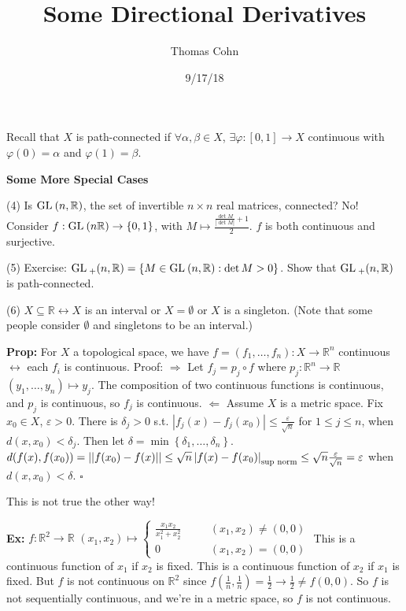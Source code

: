 \documentclass[10pt,letterpaper]{article}
\author{Thomas Cohn}
\title{Some Directional Derivatives}
\date{9/17/18} %
\newcommand{\n}{\hfill\break}
\newcommand{\prop}[1]{\par\noindent\settowidth{\hangindent}{\textbf{Prop: }}\textbf{Prop: }#1\n}
\newcommand{\ex}[1]{\par\noindent\settowidth{\hangindent}{\textbf{Ex: }}\textbf{Ex: }#1\n}
\newcommand{\proven}{\;$\square$\n}
\newcommand{\ptxt}[1]{\textrm{\textnormal{#1}}}
\newcommand{\set}[1]{\left\{#1\right\}}
\newcommand{\reals}{\mathbb{R}}
\newcommand{\R}{\reals}
\newcommand{\abs}[1]{\left|#1\right|}
\newcommand{\of}{\circ}
\newcommand{\norm}[1]{\abs{\abs{#1}}}
\newcommand{\GL}{\ptxt{GL}\>}
\newcommand{\st}{s.t.}
\begin{document}
\maketitle
\setlength\RaggedRightParindent{\parindent}
\RaggedRight

\par\noindent Recall that $X$ is path-connected if $\forall\alpha,\beta\in{}X$, $\exists\varphi:[0,1]\to{}X$ continuous with $\varphi(0)=\alpha$ and $\varphi(1)=\beta$.\n

\par\noindent\textbf{Some More Special Cases}
\par\noindent\settowidth{\hangindent}{(4) }(4) Is $\GL(n,\R)$, the set of invertible $n\times{}n$ real matrices, connected?\n
No! Consider $f:\GL(n\R)\to\set{0,1}$, with $\displaystyle{}M\mapsto\frac{\frac{\det{}M}{\abs{\det{}M}}+1}{2}$. $f$ is both continuous and surjective.\n

\par\noindent (5) Exercise: $\GL_{+}(n,\R)=\set{M\in\GL(n,\R):\det{}M>0}$. Show that $\GL_{+}(n,\R)$ is path-connected.\n

\par\noindent\settowidth{\hangindent}{(6) }(6) $X\subseteq\R\leftrightarrow{}X$ is an interval or $X=\emptyset$ or $X$ is a singleton. (Note that some people consider $\emptyset$ and singletons to be an interval.)\n

\prop{For $X$ a topological space, we have $f=(f_{1},\ldots,f_{n}):X\to\R^{n}$ continuous $\leftrightarrow$ each $f_{i}$ is continuous.\n
Proof: $\Rightarrow$ Let $f_{j}=p_{j}\of{}f$ where $p_{j}:\R^{n}\to\R$ $(y_{1},\ldots,y_{n})\mapsto{}y_{j}$. The composition of two continuous functions is continuous, and $p_{j}$ is continuous, so $f_{j}$ is continuous.\n
$\Leftarrow$ Assume $X$ is a metric space. Fix $x_{0}\in{}X$, $\varepsilon>0$. There is $\delta_{j}>0$ \st{} $\abs{f_{j}(x)-f_{j}(x_{0})}\le\frac{\varepsilon}{\sqrt{n}}$ for $1\le{}j\le{}n$, when $d(x,x_{0})<\delta_{j}$. Then let $\delta=\min\set{\delta_{1},\ldots,\delta_{n}}$.\n
$d(f(x),f(x_{0}))=\norm{f(x_{0})-f(x)}\le\sqrt{n}\abs{f(x)-f(x_{0})}_{\ptxt{sup norm}}\le\sqrt{n}\frac{\varepsilon}{\sqrt{n}}=\varepsilon$ when $d(x,x_{0})<\delta$.\n
\proven}

\par\noindent This is not true the other way!\n

\ex{$f:\R^{2}\to\R$\n
$(x_{1},x_{2})\mapsto\left\{\begin{array}{lll}\frac{x_{1}x_{2}}{x_{1}^{2}+x_{2}^{2}} & \quad & (x_{1},x_{2})\ne(0,0)\\ 0 & \quad & (x_{1},x_{2})=(0,0)\end{array}\right.$\n
This is a continuous function of $x_{1}$ if $x_{2}$ is fixed.\n
This is a continuous function of $x_{2}$ if $x_{1}$ is fixed.\n
But $f$ is not continuous on $\R^{2}$ since $f(\frac{1}{n},\frac{1}{n})=\frac{1}{2}\to\frac{1}{2}\ne{}f(0,0)$. So $f$ is not sequentially continuous, and we're in a metric space, so $f$ is not continuous.}
\end{document}
